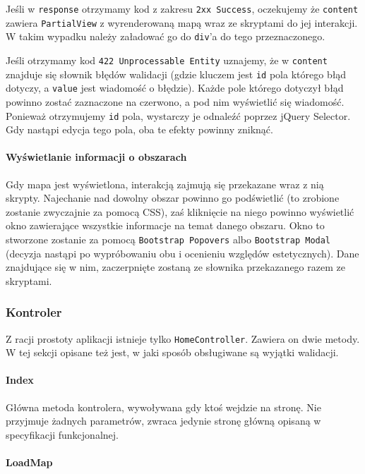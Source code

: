 \documentclass[a4paper, 10pt, titlepage]{article}
\newcommand{\code}[1]{\texttt{#1}}
\begin{document}
Jeśli w \code{response} otrzymamy kod z zakresu \code{2xx Success}, oczekujemy że \code{content} zawiera \code{PartialView} z wyrenderowaną mapą wraz ze skryptami do jej interakcji.
W takim wypadku należy załadować go do \code{div}'a do tego przeznaczonego.

Jeśli otrzymamy kod \code{422 Unprocessable Entity} uznajemy, że w \code{content} znajduje się słownik błędów walidacji (gdzie kluczem jest \code{id} pola którego błąd dotyczy, a \code{value} jest wiadomość o błędzie).
Każde pole którego dotyczył błąd powinno zostać zaznaczone na czerwono, a pod nim wyświetlić się wiadomość.
Ponieważ otrzymujemy \code{id} pola, wystarczy je odnaleźć poprzez jQuery Selector.
Gdy nastąpi edycja tego pola, oba te efekty powinny zniknąć.

\paragraph{Wyświetlanie informacji o obszarach}

Gdy mapa jest wyświetlona, interakcją zajmują się przekazane wraz z nią skrypty.
Najechanie nad dowolny obszar powinno go podświetlić (to zrobione zostanie zwyczajnie za pomocą CSS), zaś kliknięcie na niego powinno wyświetlić okno zawierające wszystkie informacje na temat danego obszaru.
Okno to stworzone zostanie za pomocą \code{Bootstrap Popovers} albo \code{Bootstrap Modal} (decyzja nastąpi po wypróbowaniu obu i ocenieniu względów estetycznych).
Dane znajdujące się w nim, zaczerpnięte zostaną ze słownika przekazanego razem ze skryptami.

\subsubsection{Kontroler}

Z racji prostoty aplikacji istnieje tylko \code{HomeController}.
Zawiera on dwie metody.
W tej sekcji opisane też jest, w jaki sposób obsługiwane są wyjątki walidacji.

\paragraph{Index}

Główna metoda kontrolera, wywoływana gdy ktoś wejdzie na stronę.
Nie przyjmuje żadnych parametrów, zwraca jedynie stronę główną opisaną w specyfikacji funkcjonalnej.

\paragraph{LoadMap}
\end{document}

